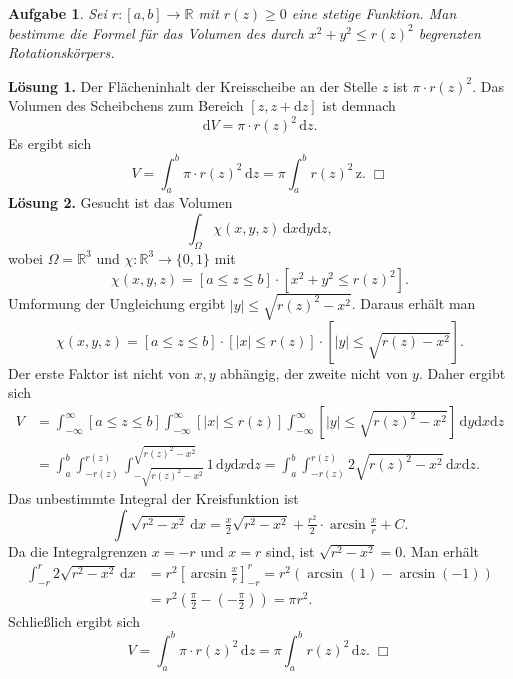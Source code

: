 \documentclass[a4paper,10pt,fleqn,twoside]{scrartcl}
\numberwithin{equation}{section}
\newcommand{\R}{\mathbb R}
\newcommand{\strong}[1]{{\normalfont\sffamily\bfseries #1}}
\theoremstyle{Aufgabe}
\newtheorem{Aufgabe}{\sffamily Aufgabe}[section]
\begin{document}
\begin{Aufgabe}
Sei $r\colon [a,b]\to\R$ mit $r(z)\ge 0$ eine stetige Funktion.
Man bestimme die Formel für das Volumen des durch $x^2+y^2\le r(z)^2$
begrenzten Rotationskörpers.
\end{Aufgabe}
\strong{Lösung 1.} Der Flächeninhalt der Kreisscheibe an der Stelle
$z$ ist $\pi\cdot r(z)^2$. Das Volumen des Scheibchens
zum Bereich $[z,z+\mathrm dz]$ ist demnach%
\begin{equation}
\mathrm dV = \pi\cdot r(z)^2\,\mathrm dz.
\end{equation}
Es ergibt sich
\begin{equation}
V = \int_a^b \pi\cdot r(z)^2\,\mathrm dz = \pi\int_a^b r(z)^2\,\mathrm z.\;\Box
\end{equation}
\strong{Lösung 2.} Gesucht ist das Volumen
\begin{equation}
\int_\Omega \chi(x,y,z)\,\mathrm dx\mathrm dy\mathrm dz,
\end{equation}
wobei $\Omega=\R^3$ und $\chi\colon\R^3\to\{0,1\}$ mit
\begin{equation}
\chi(x,y,z) = [a\le z\le b]\cdot [x^2+y^2\le r(z)^2].
\end{equation}
Umformung der Ungleichung ergibt $|y|\le\sqrt{r(z)^2-x^2}$.
Daraus erhält man%
\begin{equation}
\chi(x,y,z) = [a\le z\le b]\cdot [|x|\le r(z)]\cdot [|y|\le\sqrt{r(z)-x^2}].
\end{equation}
Der erste Faktor ist nicht von $x,y$ abhängig, der zweite nicht
von $y$. Daher ergibt sich%
\begin{align}
V &= \int_{-\infty}^\infty [a\le z\le b]
  \int_{-\infty}^\infty [|x|\le r(z)]
  \int_{-\infty}^\infty [|y|\le\sqrt{r(z)^2-x^2}]\,\mathrm dy\mathrm dx\mathrm dz\\
&= \int_a^b \int_{-r(z)}^{r(z)}
  \int_{-\sqrt{r(z)^2-x^2}}^{\sqrt{r(z)^2-x^2}}
  1\,\mathrm dy\mathrm dx\mathrm dz
= \int_a^b \int_{-r(z)}^{r(z)} 2\sqrt{r(z)^2-x^2}\,\mathrm dx\mathrm dz.
\end{align}
Das unbestimmte Integral der Kreisfunktion ist
\begin{equation}
\int \sqrt{r^2-x^2}\,\mathrm dx
= \tfrac{x}{2}\sqrt{r^2-x^2}+\tfrac{r^2}{2}\cdot\arcsin\tfrac{x}{r}+C.
\end{equation}
Da die Integralgrenzen $x=-r$ und $x=r$ sind, ist $\sqrt{r^2-x^2}=0$.
Man erhält%
\begin{align}
\int_{-r}^r 2\sqrt{r^2-x^2}\,\mathrm dx
&= r^2[\arcsin\tfrac{x}{r}]_{-r}^r
= r^2(\arcsin(1)-\arcsin(-1))\\
&= r^2(\tfrac{\pi}{2}-(-\tfrac{\pi}{2}))
= \pi r^2.
\end{align}
Schließlich ergibt sich
\begin{equation}
V = \int_a^b \pi\cdot r(z)^2\,\mathrm dz
= \pi\int_a^b r(z)^2\,\mathrm dz.\;\Box
\end{equation}
\end{document}
